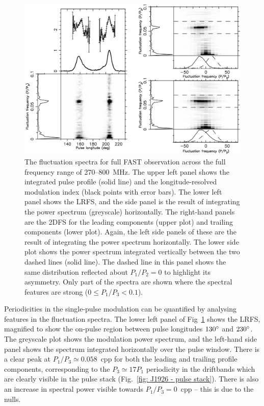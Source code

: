 \begin{figure}
    \begin{center}
        \includegraphics[width=1.0\textwidth]{Figures/J1926/fluctuation_spectra}
        \caption[LRFS and 2DFS of PSR~J1926$-$0652]{The fluctuation spectra for full FAST observation across the full frequency range of 270--800~MHz. The upper left panel shows the integrated pulse profile (solid line) and the longitude-resolved modulation index (black points with error bars). The lower left panel shows the LRFS, and the side panel is the result of integrating the power spectrum (greyscale) horizontally. The right-hand panels are the 2DFS for the leading components (upper plot) and trailing components (lower plot). Again, the left side panels of these are the result of integrating the power spectrum horizontally. The lower side plot shows the power spectrum integrated vertically between the two dashed lines (solid line). The dashed line in this panel shows the same distribution reflected about $P_1/P_2 = 0$ to highlight its asymmetry. Only part of the spectra are shown where the spectral features are strong ($0 \leq P_1/P_3 < 0.1$).}
        \label{fig: J1926 - fluctuation spectra}
    \end{center}
\end{figure}

Periodicities in the single-pulse modulation can be quantified by analysing features in the fluctuation spectra. The lower left panel of Fig~\ref{fig: J1926 - fluctuation spectra} shows the LRFS, magnified to show the on-pulse region between pulse longitudes $130^\circ$ and $230^\circ$. The greyscale plot shows the modulation power spectrum, and the left-hand side panel shows the spectrum integrated horizontally over the pulse window. There is a clear peak at $P_1/P_3 \simeq 0.058$~cpp for both the leading and trailing profile components, corresponding to the $P_3 \simeq 17 P_1$ periodicity in the driftbands which are clearly visible in the pulse stack (Fig.~\ref{fig: J1926 - pulse stack}). There is also an increase in spectral power visible towards $P_1/P_3 = 0$~cpp -- this is due to the nulls.

